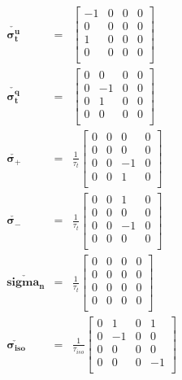 \documentclass[notitlepage, superscriptaddress]{revtex4-2}
\begin{document}
\begin{eqnarray}
\boldsymbol{\check{\sigma^{u}_{t}}} &=& 
    \begin{bmatrix}
    -1 & 0 & 0 & 0  \\ 
    0 & 0 & 0 & 0   \\
    1 & 0 & 0 & 0   \\
    0 & 0 & 0 & 0   \\
    \end{bmatrix}   \\
%
\boldsymbol{\check{\sigma^{q}_{t}}} &=& 
    \begin{bmatrix}
    0 & 0 & 0 & 0  \\ 
    0 & -1 & 0 & 0   \\
    0 & 1 & 0 & 0   \\
    0 & 0 & 0 & 0   \\
    \end{bmatrix}   \\
%
\boldsymbol{\check{\sigma_{+}}} &=& \frac{1}{\tau_{t}}
    \begin{bmatrix}
    0 & 0 & 0 & 0   \\ 
    0 & 0 & 0 & 0   \\
    0 & 0 & -1 & 0  \\
    0 & 0 & 1 & 0   \\
    \end{bmatrix}   \\ 
%
\boldsymbol{\check{\sigma_{-}}} &=& \frac{1}{\tau_{t}}
    \begin{bmatrix}
    0 & 0 & 1 & 0   \\ 
    0 & 0 & 0 & 0   \\
    0 & 0 & -1 & 0  \\
    0 & 0 & 0 & 0   \\
    \end{bmatrix}   \\ 
%
\boldsymbol{\check{sigma_{n}}} &=& \frac{1}{\tau_{t}}
    \begin{bmatrix}
    0 & 0 & 0 & 0   \\ 
    0 & 0 & 0 & 0   \\
    0 & 0 & 0 & 0  \\
    0 & 0 & 0 & 0   \\
    \end{bmatrix}   \\ 
%
\boldsymbol{\check{\sigma_{iso}}} &=& \frac{1}{\tau_{iso}}
    \begin{bmatrix}
    0 & 1 & 0 & 1   \\ 
    0 & -1 & 0 & 0  \\
    0 & 0 & 0 & 0   \\
    0 & 0 & 0 & -1  \\
    \end{bmatrix}
\end{eqnarray}
\end{document}
